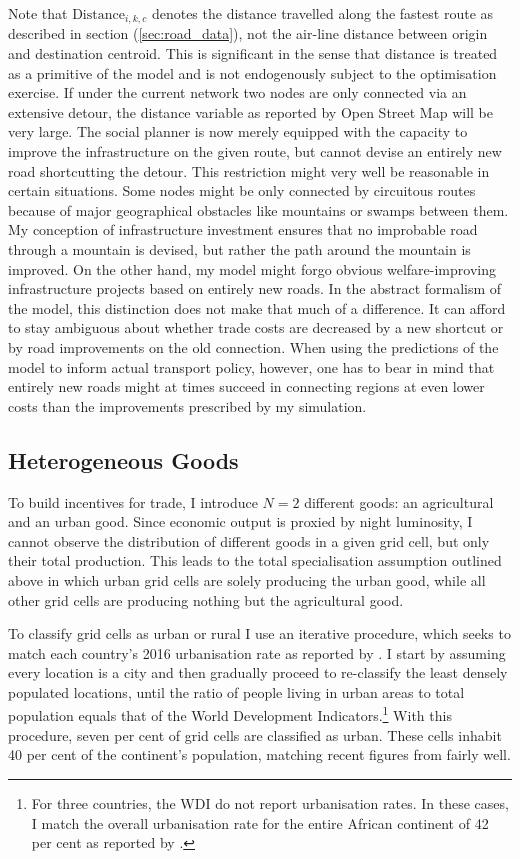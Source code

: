 \documentclass[11pt, oneside]{article}   	%
\let\oldref\ref
\renewcommand{\ref}[1]{(\oldref{#1})}
\begin{document}
Note that $\textrm{Distance}_{i,k,c}$ denotes the distance travelled along the fastest route as described in section \ref{sec:road_data}, not the air-line distance between origin and destination centroid. This is significant in the sense that distance is treated as a primitive of the model and is not endogenously subject to the optimisation exercise. If under the current network two nodes are only connected via an extensive detour, the distance variable as reported by Open Street Map will be very large. The social planner is now merely equipped with the capacity to improve the infrastructure on the given route, but cannot devise an entirely new road shortcutting the detour. This restriction might very well be reasonable in certain situations. Some nodes might be only connected by circuitous routes because of major geographical obstacles like mountains or swamps between them. My conception of infrastructure investment ensures that no improbable road through a mountain is devised, but rather the path around the mountain is improved. On the other hand, my model might forgo obvious welfare-improving infrastructure projects based on entirely new roads. In the abstract formalism of the model, this distinction does not make that much of a difference. It can afford to stay ambiguous about whether trade costs are decreased by a new shortcut or by road improvements on the old connection. When using the predictions of the model to  inform actual transport policy, however, one has to bear in mind that entirely new roads might at times succeed in connecting regions at even lower costs than the improvements prescribed by my simulation.

\subsection{Heterogeneous Goods}
To build incentives for trade, I introduce $N=2$ different goods: an agricultural and an urban good. Since economic output is proxied by night luminosity, I cannot observe the distribution of different goods in a given grid cell, but only their total production. This leads to the total specialisation assumption outlined above in which urban grid cells are solely producing the urban good, while all other grid cells are producing nothing but the agricultural good.

To classify grid cells as urban or rural I use an iterative procedure, which seeks to match each country's 2016 urbanisation rate as reported by \cite{TheWorldBank_WorldBankAnnual_2017}. I start by assuming every location is a city and then gradually proceed to re-classify the least densely populated locations, until the ratio of people living in urban areas to total population equals that of the World Development Indicators.\footnote{For three countries, the WDI do not report urbanisation rates. In these cases, I match the overall urbanisation rate for the entire African continent of 42 per cent as reported by \cite{Lall_AfricaCitiesOpening_2017}.} With this procedure, seven per cent of grid cells are classified as urban. These cells inhabit 40 per cent of the continent's population, matching recent figures from \cite{Lall_AfricaCitiesOpening_2017} fairly well.
\end{document}

